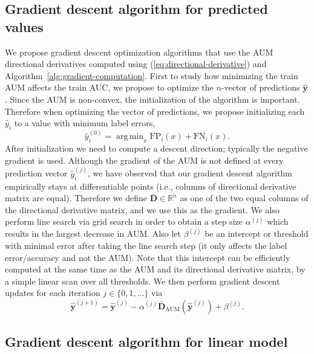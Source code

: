\documentclass{article}
\DeclareMathOperator*{\argmin}{arg\, min}
\begin{document}
\subsection{Gradient descent algorithm for predicted values}
\label{sec:gradient-descent}

We propose gradient descent optimization algorithms that use the AUM directional derivatives computed using (\ref{eq:directional-derivative}) and Algorithm~\ref{alg:gradient-computation}.
First to study how minimizing the train AUM affects the train AUC, we propose to optimize the $n$-vector of predictions $\mathbf{\hat{y}}$.
Since the AUM is non-convex, the initialization of the algorithm is important. Therefore when optimizing the vector of predictions, we propose initializing each $\hat y_i$ to a value with minimum label errors, 
\begin{equation}
    \hat y_i^{(0)} = \argmin_x 
    \text{FP}_i(x) + 
    \text{FN}_i(x).
\end{equation}
After initialization we need to compute a descent direction; typically the negative gradient is used.
Although the gradient of the AUM is not defined at every prediction vector $\hat y_i^{(j)}$, we have observed that our gradient descent algorithm empirically stays at differentiable points (i.e., columns of directional derivative matrix are equal).
Therefore we define $\mathbf{\bar D}\in\mathbb R^n$ as one of the two equal columns of the directional derivative matrix, and we use this as the gradient.
We also perform line search via grid search in order to obtain a step size $\alpha^{(j)}$ which results in the largest decrease in AUM.
Also let $\beta^{(j)}$ be an intercept or threshold with minimal error after taking the line search step (it only affects the label error/accuracy and not the AUM).
Note that this intercept can be efficiently computed at the same time as the AUM and its directional derivative matrix, by a simple linear scan over all thresholds.
We then perform gradient descent updates for each iteration $j\in\{0,1,\dots\}$ via
\begin{equation}
    \mathbf{\hat y}^{(j+1)} = \mathbf{\hat y}^{(j)} - \alpha^{(j)} \mathbf {\bar D}_\text{AUM}(\mathbf {\hat y}^{(j)}) + \beta^{(j)}.
\end{equation}

\subsection{Gradient descent algorithm for linear model}
\end{document}
